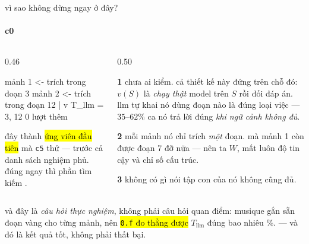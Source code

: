 \begin{frame}[fragile]{vì sao không dừng ngay ở đây?}
  \framesubtitle{c0}

  \begin{columns}[t]
  \begin{column}{0.46\textwidth}
    \begin{keyb}[title={và ta có dùng nó thật}]
      \begin{dia}
mảnh 1 <- trích trong đoạn  3
mảnh 2 <- trích trong đoạn 12
                 |
                 v
        T_llm = {3, 12}     0 lượt thêm
      \end{dia}
      \vspace{0.25em}
      đây thành \hl{ứng viên đầu tiên} mà \texttt{c5} thử — trước cả danh sách
      nghiệm phủ. đúng ngay thì phần tìm kiếm .
    \end{keyb}
  \end{column}
  \begin{column}{0.50\textwidth}
    \begin{badb}[title={nhưng nó là một \emph{lời khai}, không phải một \emph{phép đo}}]
      \textbf{1}\; chưa ai kiểm. cả thiết kế này đứng trên chỗ đó: $v(S)$ là
      \emph{chạy thật} model trên $S$ rồi đối đáp án. llm tự khai nó dùng đoạn nào
      là đúng loại việc  — $35$–$62\%$ ca nó trả lời đúng
      \emph{khi ngữ cảnh không đủ}.
      \vspace{0.3em}

      \textbf{2}\; mỗi mảnh nó chỉ trích \emph{một} đoạn. mà mảnh 1 còn được đoạn 7
      đỡ nữa — nên ta  $W$, mất luôn độ tin cậy và chỉ số cấu trúc.
      \vspace{0.3em}

      \textbf{3}\; không có gì nói tập con của nó không cũng đủ.
    \end{badb}
  \end{column}
  \end{columns}

  \vspace{0.3em}
  \begin{keyb}
    và đây là \emph{câu hỏi thực nghiệm}, không phải câu hỏi quan điểm: musique gắn
    sẵn đoạn vàng cho từng mảnh, nên \hl{\texttt{0.f} đo thẳng được} $T_{\text{llm}}$
    đúng bao nhiêu \%.  — và đó là kết quả tốt, không phải thất bại.
  \end{keyb}
\end{frame}

